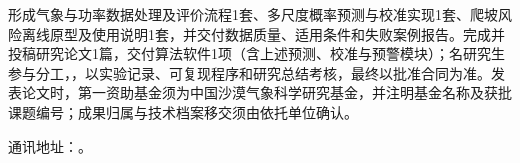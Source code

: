 形成气象与功率数据处理及评价流程1套、多尺度概率预测与校准实现1套、爬坡风险离线原型及使用说明1套，并交付数据质量、适用条件和失败案例报告。完成并投稿研究论文1篇，交付算法软件1项（含上述预测、校准与预警模块）；名研究生参与分工，，以实验记录、可复现程序和研究总结考核，最终以批准合同为准。发表论文时，第一资助基金须为中国沙漠气象科学研究基金，并注明基金名称及获批课题编号；成果归属与技术档案移交须由依托单位确认。

通讯地址：。
